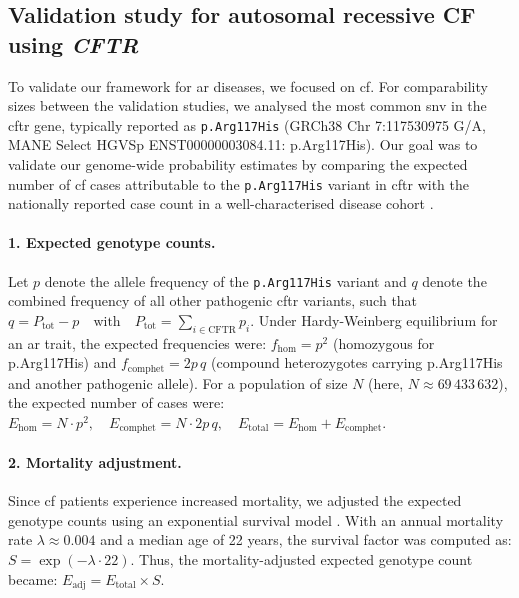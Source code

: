
\subsection{Validation study for autosomal recessive CF using \textit{CFTR}}

To validate our framework for \ac{ar} diseases, we focused on \ac{cf}.
For comparability sizes between the validation studies, we analysed the most common \ac{snv} in the \ac{cftr} gene, typically reported as \texttt{p.Arg117His} (GRCh38 Chr 7:117530975 G/A, MANE Select HGVSp ENST00000003084.11: p.Arg117His).
Our goal was to validate our genome-wide probability estimates by comparing the expected number of \ac{cf} cases attributable to the \texttt{p.Arg117His} variant in \ac{cftr} with the nationally reported case count in a well-characterised disease cohort
\cite{naito2023uk, castellani2013cftr2, Grasemann2023cftr}.

\paragraph{1. Expected genotype counts.}
Let \( p \) denote the allele frequency of the \texttt{p.Arg117His} variant and \( q \) denote the combined frequency of all other pathogenic \ac{cftr} variants, such that
$q = P_{\text{tot}} - p \quad \text{with} \quad P_{\text{tot}} = \sum_{i \in \text{CFTR}} p_i$.
Under Hardy-Weinberg equilibrium for an \ac{ar} trait, the expected frequencies were:
$f_{\text{hom}} = p^2$ (homozygous for p.Arg117His)
and
$f_{\text{comphet}} = 2p\,q$ 
(compound heterozygotes carrying p.Arg117His and another pathogenic allele).
For a population of size \( N \) (here, \( N \approx 69\,433\,632 \)), the expected number of cases were:
$E_{\text{hom}} = N \cdot p^2,\quad E_{\text{comphet}} = N \cdot 2p\,q,\quad E_{\text{total}} = E_{\text{hom}} + E_{\text{comphet}}$.

\paragraph{2. Mortality adjustment.}
Since \ac{cf} patients experience increased mortality, we adjusted the expected genotype counts using an exponential survival model \cite{naito2023uk, castellani2013cftr2, Grasemann2023cftr}. With an annual mortality rate \(\lambda \approx 0.004\) and a median age of 22 years, the survival factor was computed as:
$S = \exp(-\lambda \cdot 22)$.
Thus, the mortality-adjusted expected genotype count became:
$E_{\text{adj}} = E_{\text{total}} \times S$.

